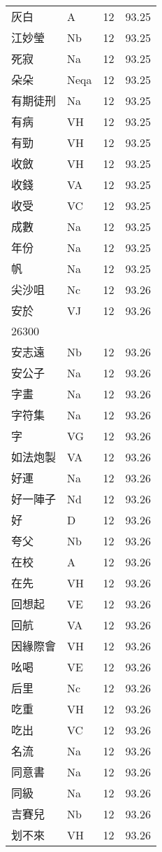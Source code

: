 \documentclass[twocolumn]{book}
\begin{document}
\begin{supertabular}{llrr}
灰白 & A & 12 &  93.25\\
江妙瑩 & Nb & 12 &  93.25\\
死寂 & Na & 12 &  93.25\\
朵朵 & Neqa & 12 &  93.25\\
有期徒刑 & Na & 12 &  93.25\\
有病 & VH & 12 &  93.25\\
有勁 & VH & 12 &  93.25\\
收斂 & VH & 12 &  93.25\\
收錢 & VA & 12 &  93.25\\
收受 & VC & 12 &  93.25\\
成數 & Na & 12 &  93.25\\
年份 & Na & 12 &  93.25\\
帆 & Na & 12 &  93.25\\
尖沙咀 & Nc & 12 &  93.26\\
安於 & VJ & 12 &  93.26\\
26300\\
安志遠 & Nb & 12 &  93.26\\
安公子 & Na & 12 &  93.26\\
字畫 & Na & 12 &  93.26\\
字符集 & Na & 12 &  93.26\\
字 & VG & 12 &  93.26\\
如法炮製 & VA & 12 &  93.26\\
好運 & Na & 12 &  93.26\\
好一陣子 & Nd & 12 &  93.26\\
好 & D & 12 &  93.26\\
夸父 & Nb & 12 &  93.26\\
在校 & A & 12 &  93.26\\
在先 & VH & 12 &  93.26\\
回想起 & VE & 12 &  93.26\\
回航 & VA & 12 &  93.26\\
因緣際會 & VH & 12 &  93.26\\
吆喝 & VE & 12 &  93.26\\
后里 & Nc & 12 &  93.26\\
吃重 & VH & 12 &  93.26\\
吃出 & VC & 12 &  93.26\\
名流 & Na & 12 &  93.26\\
同意書 & Na & 12 &  93.26\\
同級 & Na & 12 &  93.26\\
吉賽兒 & Nb & 12 &  93.26\\
划不來 & VH & 12 &  93.26\\

\end{supertabular}
\end{document}

